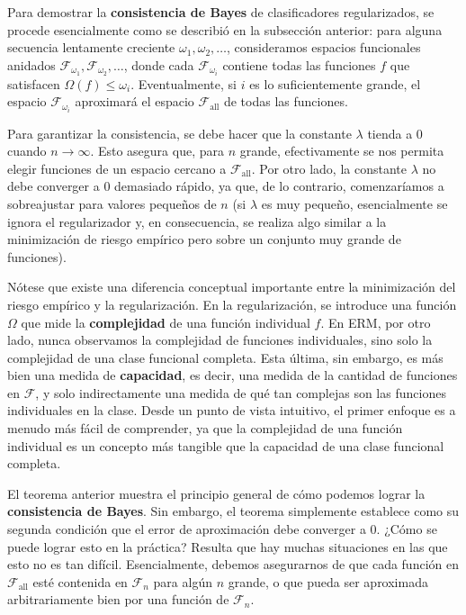 \documentclass{report}
\begin{document}
Para demostrar la \textbf{consistencia de Bayes} de clasificadores regularizados, se procede esencialmente como 
se describió en la subsección anterior: para alguna secuencia lentamente creciente \(\omega_1, \omega_2, \dots\), 
consideramos espacios funcionales anidados \(\mathcal{F}_{\omega_1}, \mathcal{F}_{\omega_2}, \dots\), donde cada 
\(\mathcal{F}_{\omega_i}\) contiene todas las funciones \(f\) que satisfacen \(\Omega(f) \leq \omega_i\). 
Eventualmente, si \(i\) es lo suficientemente grande, el espacio \(\mathcal{F}_{\omega_i}\) aproximará el 
espacio \(\mathcal{F}_{\text{all}}\) de todas las funciones.\newline

Para garantizar la consistencia, se debe hacer que la constante \(\lambda\) tienda a \(0\) cuando \(n \to \infty\). 
Esto asegura que, para \(n\) grande, efectivamente se nos permita elegir funciones de un espacio cercano a 
\(\mathcal{F}_{\text{all}}\). Por otro lado, la constante \(\lambda\) no debe converger a \(0\) demasiado rápido, 
ya que, de lo contrario, comenzaríamos a sobreajustar para valores pequeños de \(n\) (si \(\lambda\) es muy 
pequeño, esencialmente se ignora el regularizador y, en consecuencia, se realiza algo similar a la minimización
de riesgo empírico pero sobre un conjunto muy grande de funciones).\newline

Nótese que existe una diferencia conceptual importante entre la minimización del riesgo empírico y la 
regularización. En la regularización, se introduce una función \(\Omega\) que mide la \textbf{complejidad} de 
una función individual \(f\). En ERM, por otro lado, nunca observamos la complejidad de funciones individuales, 
sino solo la complejidad de una clase funcional completa. Esta última, sin embargo, es más bien una medida de 
\textbf{capacidad}, es decir, una medida de la cantidad de funciones en \(\mathcal{F}\), y solo indirectamente 
una medida de qué tan complejas son las funciones individuales en la clase. Desde un punto de vista intuitivo, 
el primer enfoque es a menudo más fácil de comprender, ya que la complejidad de una función individual es un 
concepto más tangible que la capacidad de una clase funcional completa.\newline

El teorema anterior muestra el principio general de cómo podemos lograr la \textbf{consistencia de Bayes}. 
Sin embargo, el teorema simplemente establece como su segunda condición que el error de aproximación 
debe converger a \(0\). ¿Cómo se puede lograr esto en la práctica? Resulta que hay muchas situaciones 
en las que esto no es tan difícil. Esencialmente, debemos asegurarnos de que cada función en 
\(\mathcal{F}_{\text{all}}\) esté contenida en \(\mathcal{F}_n\) para algún \(n\) grande, o que pueda 
ser aproximada arbitrariamente bien por una función de \(\mathcal{F}_n\).\newline
\end{document}
